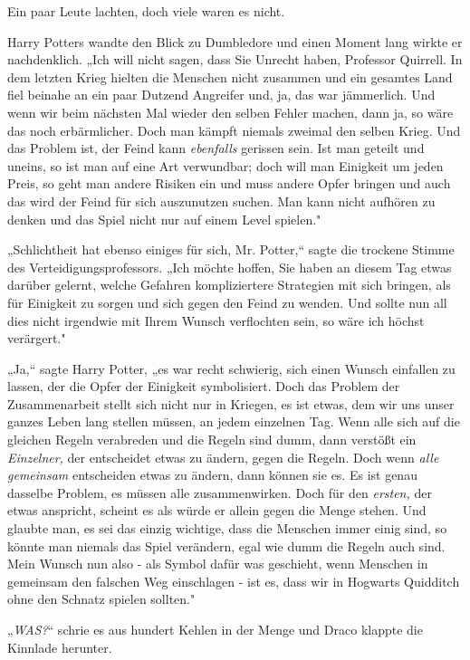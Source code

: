 {Ein paar Leute lachten, doch viele waren es nicht.

Harry Potters wandte den Blick zu Dumbledore und einen Moment lang wirkte er nachdenklich. „Ich will nicht sagen, dass Sie Unrecht haben, Professor Quirrell. In dem letzten Krieg hielten die Menschen nicht zusammen und ein gesamtes Land fiel beinahe an ein paar Dutzend Angreifer und, ja, das war jämmerlich. Und wenn wir beim nächsten Mal wieder den selben Fehler machen, dann ja, so wäre das noch erbärmlicher. Doch man kämpft niemals zweimal den selben Krieg. Und das Problem ist, der Feind kann \emph{ebenfalls} gerissen sein. Ist man geteilt und uneins, so ist man auf eine Art verwundbar; doch will man Einigkeit um jeden Preis, so geht man andere Risiken ein und muss andere Opfer bringen und auch das wird der Feind für sich auszunutzen suchen. Man kann nicht aufhören zu denken und das Spiel nicht nur auf einem Level spielen."

„Schlichtheit hat ebenso einiges für sich, Mr. Potter,“ sagte die trockene Stimme des Verteidigungsprofessors. „Ich möchte hoffen, Sie haben an diesem Tag etwas darüber gelernt, welche Gefahren kompliziertere Strategien mit sich bringen, als für Einigkeit zu sorgen und sich gegen den Feind zu wenden. Und sollte nun all dies nicht irgendwie mit Ihrem Wunsch verflochten sein, so wäre ich höchst verärgert."

„Ja,“ sagte Harry Potter, „es war recht schwierig, sich einen Wunsch einfallen zu lassen, der die Opfer der Einigkeit symbolisiert. Doch das Problem der Zusammenarbeit stellt sich nicht nur in Kriegen, es ist etwas, dem wir uns unser ganzes Leben lang stellen müssen, an jedem einzelnen Tag. Wenn alle sich auf die gleichen Regeln verabreden und die Regeln sind dumm, dann verstößt ein \emph{Einzelner,} der entscheidet etwas zu ändern, gegen die Regeln. Doch wenn \emph{alle gemeinsam} entscheiden etwas zu ändern, dann können sie es. Es ist genau dasselbe Problem, es müssen alle zusammenwirken. Doch für den \emph{ersten,} der etwas anspricht, scheint es als würde er allein gegen die Menge stehen. Und glaubte man, es sei das einzig wichtige, dass die Menschen immer einig sind, so könnte man niemals das Spiel verändern, egal wie dumm die Regeln auch sind. Mein Wunsch nun also - als Symbol dafür was geschieht, wenn Menschen in gemeinsam den falschen Weg einschlagen - ist es, dass wir in Hogwarts Quidditch ohne den Schnatz spielen sollten."

„\emph{WAS?}“ schrie es aus hundert Kehlen in der Menge und Draco klappte die Kinnlade herunter.

}

